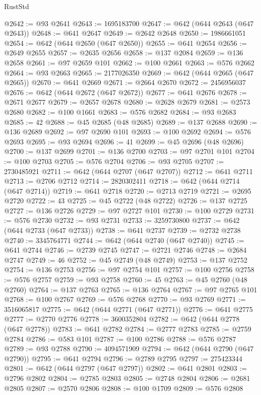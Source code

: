 \begin{lexlean}{RustStd}
\begin{coremodule}
@2642 := @93 @2641
@2643 := 1695183700
@2647 := @642 (@644 @2643 (@647 @2643))
@2648 := @641 @2647
@2649 := @2642 @2648
@2650 := 1986661051
@2654 := @642 (@644 @2650 (@647 @2650))
@2655 := @641 @2654
@2656 := @2649 @2655
@2657 := @2635 @2656
@2658 := @137 @2084
@2659 := @136 @2658
@2661 := @97 @2659 @101
@2662 := @100 @2661
@2663 := @576 @2662
@2664 := @93 @2663
@2665 := 2177026350
@2669 := @642 (@644 @2665 (@647 @2665))
@2670 := @641 @2669
@2671 := @2664 @2670
@2672 := 2456956037
@2676 := @642 (@644 @2672 (@647 @2672))
@2677 := @641 @2676
@2678 := @2671 @2677
@2679 := @2657 @2678
@2680 := @2628 @2679
@2681 := @2573 @2680
@2682 := @100 @1661
@2683 := @576 @2682
@2684 := @93 @2683
@2685 := 42
@2688 := @45 @2685 (@48 @2685)
@2689 := @137 @2688
@2690 := @136 @2689
@2692 := @97 @2690 @101
@2693 := @100 @2692
@2694 := @576 @2693
@2695 := @93 @2694
@2696 := 41
@2699 := @45 @2696 (@48 @2696)
@2700 := @137 @2699
@2701 := @136 @2700
@2703 := @97 @2701 @101
@2704 := @100 @2703
@2705 := @576 @2704
@2706 := @93 @2705
@2707 := 2730485921
@2711 := @642 (@644 @2707 (@647 @2707))
@2712 := @641 @2711
@2713 := @2706 @2712
@2714 := 2820302411
@2718 := @642 (@644 @2714 (@647 @2714))
@2719 := @641 @2718
@2720 := @2713 @2719
@2721 := @2695 @2720
@2722 := 43
@2725 := @45 @2722 (@48 @2722)
@2726 := @137 @2725
@2727 := @136 @2726
@2729 := @97 @2727 @101
@2730 := @100 @2729
@2731 := @576 @2730
@2732 := @93 @2731
@2733 := 3259730800
@2737 := @642 (@644 @2733 (@647 @2733))
@2738 := @641 @2737
@2739 := @2732 @2738
@2740 := 3345764771
@2744 := @642 (@644 @2740 (@647 @2740))
@2745 := @641 @2744
@2746 := @2739 @2745
@2747 := @2721 @2746
@2748 := @2684 @2747
@2749 := 46
@2752 := @45 @2749 (@48 @2749)
@2753 := @137 @2752
@2754 := @136 @2753
@2756 := @97 @2754 @101
@2757 := @100 @2756
@2758 := @576 @2757
@2759 := @93 @2758
@2760 := 45
@2763 := @45 @2760 (@48 @2760)
@2764 := @137 @2763
@2765 := @136 @2764
@2767 := @97 @2765 @101
@2768 := @100 @2767
@2769 := @576 @2768
@2770 := @93 @2769
@2771 := 3516065817
@2775 := @642 (@644 @2771 (@647 @2771))
@2776 := @641 @2775
@2777 := @2770 @2776
@2778 := 3600352804
@2782 := @642 (@644 @2778 (@647 @2778))
@2783 := @641 @2782
@2784 := @2777 @2783
@2785 := @2759 @2784
@2786 := @583 @101
@2787 := @100 @2786
@2788 := @576 @2787
@2789 := @93 @2788
@2790 := 4094571909
@2794 := @642 (@644 @2790 (@647 @2790))
@2795 := @641 @2794
@2796 := @2789 @2795
@2797 := 275423344
@2801 := @642 (@644 @2797 (@647 @2797))
@2802 := @641 @2801
@2803 := @2796 @2802
@2804 := @2785 @2803
@2805 := @2748 @2804
@2806 := @2681 @2805
@2807 := @2570 @2806
@2808 := @100 @1709
@2809 := @576 @2808

\end{coremodule}
\end{lexlean}
